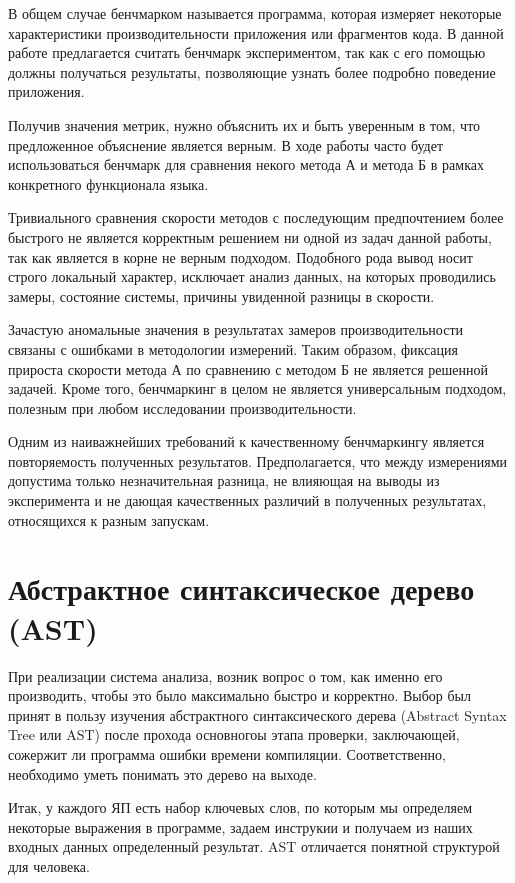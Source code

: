 \documentclass{mipt-thesis-bs}
\begin{document}
В общем случае бенчмарком называется программа, которая измеряет некоторые характеристики
производительности приложения или фрагментов кода. В данной работе предлагается считать
бенчмарк экспериментом, так как с его помощью должны получаться результаты, позволяющие
узнать более подробно поведение приложения.

Получив значения метрик, нужно объяснить их и быть уверенным в том, что предложенное
объяснение является верным. В ходе работы часто будет использоваться бенчмарк для
сравнения некого метода А и метода Б в рамках конкретного функционала языка.

Тривиального сравнения скорости методов с последующим предпочтением более быстрого не является
корректным решением ни одной из задач данной работы, так как является в корне не верным подходом.
Подобного рода вывод носит строго локальный характер, исключает анализ данных, на которых
проводились замеры, состояние системы, причины увиденной разницы в скорости.

Зачастую аномальные значения в результатах замеров производительности связаны с
ошибками в методологии измерений. Таким образом, фиксация прироста скорости метода А по сравнению
с методом Б не является решенной задачей. Кроме того, бенчмаркинг в целом не является
универсальным подходом, полезным при любом исследовании производительности.

Одним из наиважнейших требований к качественному бенчмаркингу является повторяемость
полученных результатов. Предполагается, что между измерениями допустима только незначительная
разница, не влияющая на выводы из эксперимента и не дающая качественных различий в полученных
результатах, относящихся к разным запускам.

\section{Абстрактное синтаксическое дерево (AST)}

При реализации система анализа, возник вопрос о том, как именно его производить, чтобы это
было максимально быстро и корректно. Выбор был принят в пользу изучения абстрактного
синтаксического дерева (Abstract Syntax Tree или AST) после прохода основногоы
этапа проверки, заключающей, сожержит ли программа ошибки времени компиляции. Соответственно, необходимо
уметь понимать это дерево на выходе.

Итак, у каждого ЯП есть набор ключевых слов, по которым мы определяем некоторые выражения в программе,
задаем инструкии и получаем из наших входных данных определенный результат. AST отличается понятной
структурой для человека.
\end{document}
